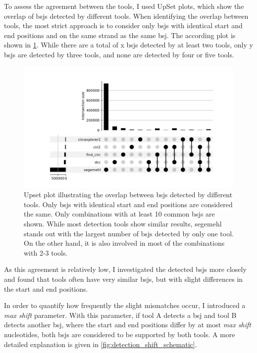 To assess the agreement between the tools, I used UpSet plots, which show the
overlap of \gls{bsj}s detected by different tools.
When identifying the overlap between tools, the most strict approach is to
consider only \gls{bsj}s with identical start and end positions and on the same
strand as the same \gls{bsj}.
The according plot is shown in \cref{fig:detection_upset_0}.
While there are a total of x \gls{bsj}s detected by at least two tools, only y
\gls{bsj}s are detected by three tools, and none are detected by four or five
tools.

\begin{figure}[H]
    \centering

    \includegraphics[width=\textwidth]{chapters/4_results_and_discussion/figures/detection/upset/shift_0.png}
    \caption{Upset plot illustrating the overlap between \gls{bsj}s detected by
        different tools.
        Only \gls{bsj}s with identical start and end positions are considered the same.
        Only combinations with at least 10 common \gls{bsj}s are shown.
        While most detection tools show similar results, segemehl stands out with the
        largest number of \gls{bsj}s detected by only one tool.
        On the other hand, it is also involved in most of the combinations with 2-3
        tools.
    } \label{fig:detection_upset_0} \end{figure}

As this agreement is relatively low, I investigated the detected \gls{bsj}s
more closely and found that tools often have very similar \gls{bsj}s, but with
slight differences in the start and end positions.

In order to quantify how frequently the slight mismatches occur, I introduced a
\textit{max shift} parameter.
With this parameter, if tool A detects a \gls{bsj} and tool B detects another
\gls{bsj}, where the start and end positions differ by at most \textit{max
    shift} nucleotides, both \gls{bsj}s are considered to be supported by both
tools.
A more detailed explanation is given in \cref{fig:detection_shift_schematic}.

